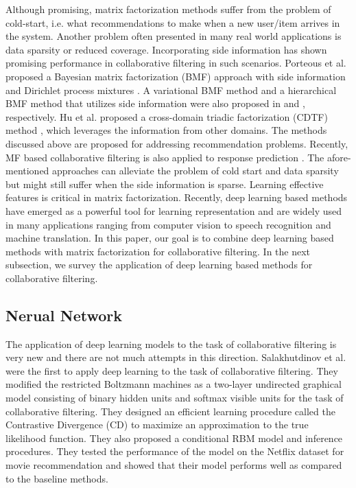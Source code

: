 \documentclass{sig-alternate-05-2015}
\begin{document}
Although promising, matrix factorization methods suffer from the problem of cold-start,
i.e. what recommendations to make when a new user/item arrives in the system.
Another problem often presented in many real world applications is data sparsity
or reduced coverage.
Incorporating side information has shown promising performance
in collaborative filtering in such scenarios.
Porteous et al. proposed a Bayesian matrix factorization (BMF) approach
with side information and Dirichlet process mixtures \cite{porteous2010bayesian}.
A variational BMF method and a hierarchical BMF method that utilizes
side information were also proposed in \cite{kim2014scalable} and \cite{park2013hierarchical}, respectively.
Hu et al. proposed a cross-domain triadic factorization (CDTF)
method \cite{hu2013personalized}, which leverages the information from other domains.
The methods discussed above are proposed for addressing recommendation
problems.
Recently, MF based collaborative filtering is also applied to response prediction \cite{menon2011response, li2015predicting}.
The afore-mentioned approaches can alleviate the problem of cold start
and data sparsity but might still suffer when the side information is sparse.
Learning effective features is critical in matrix factorization.
Recently, deep learning based methods have emerged as a powerful tool
for learning representation and are widely used in many applications
ranging from computer vision to speech recognition and machine translation.
In this paper, our goal is to combine deep learning based methods with
matrix factorization for collaborative filtering.
In the next subsection, we survey the application of deep learning
based methods for collaborative filtering.

\subsection{Nerual Network}
The application of deep learning models to the task of collaborative filtering
is very new and there are not much attempts in this direction.
Salakhutdinov et al. \cite{salakhutdinov2007restricted} were the first to apply deep learning to the task of collaborative filtering.
They modified the restricted Boltzmann machines as a two-layer undirected graphical model
consisting of binary hidden units and softmax visible units for the task of collaborative filtering.
They designed an efficient learning procedure called the Contrastive Divergence (CD) to
maximize an approximation to the true likelihood function.
They also proposed a conditional RBM model and inference procedures.
They tested the performance of the model on the Netflix dataset for movie recommendation
and showed that their model performs well as compared to the baseline methods.
\end{document}
